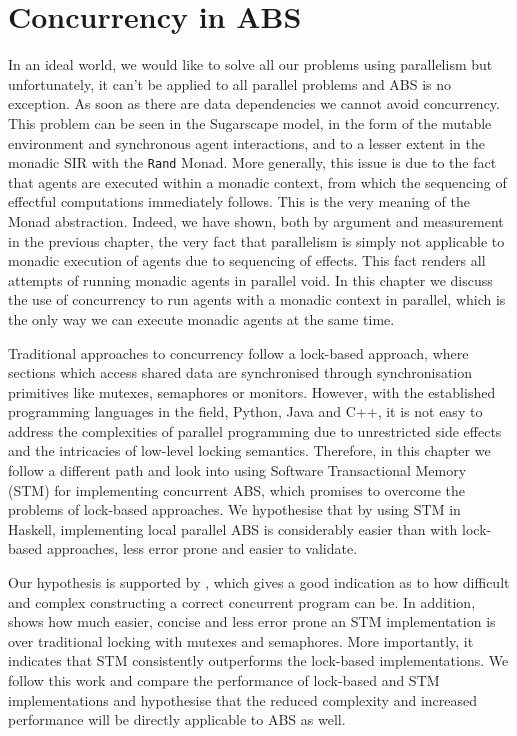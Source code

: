 \chapter{Concurrency in ABS}
\label{ch:concurrent_abs}
In an ideal world, we would like to solve all our problems using parallelism but unfortunately, it can't be applied to all parallel problems and ABS is no exception. As soon as there are data dependencies we cannot avoid concurrency. This problem can be seen in the Sugarscape model, in the form of the mutable environment and synchronous agent interactions, and to a lesser extent in the monadic SIR with the \texttt{Rand} Monad. More generally, this issue is due to the fact that agents are executed within a monadic context, from which the  sequencing of effectful computations immediately follows. This is the very meaning of the Monad abstraction. Indeed, we have shown, both by argument and measurement in the previous chapter, the very fact that parallelism is simply not applicable to monadic execution of agents due to sequencing of effects. This fact renders all attempts of running monadic agents in parallel void. In this chapter we discuss the use of concurrency to run agents with a monadic context in parallel, which is the only way we can execute monadic agents at the same time.

\medskip

Traditional approaches to concurrency follow a lock-based approach, where sections which access shared data are synchronised through synchronisation primitives like mutexes, semaphores or monitors. However, with the established programming languages in the field, Python, Java and C++, it is not easy to address the complexities of parallel programming due to unrestricted side effects and the intricacies of low-level locking semantics. Therefore, in this chapter we follow a different path and look into using Software Transactional Memory (STM) for implementing concurrent ABS, which promises to overcome the problems of lock-based approaches. We hypothesise that by using STM in Haskell, implementing local parallel ABS is considerably easier than with lock-based approaches, less error prone and easier to validate.

Our hypothesis is supported by \cite{discolo_lock_2006}, which gives a good indication as to how difficult and complex constructing a correct concurrent program can be. In addition, \cite{discolo_lock_2006} shows how much easier, concise and less error prone an STM implementation is over traditional locking with mutexes and semaphores. More importantly, it indicates that STM consistently outperforms the lock-based implementations. We follow this work and compare the performance of lock-based and STM implementations and hypothesise that the reduced complexity and increased performance will be directly applicable to ABS as well.

